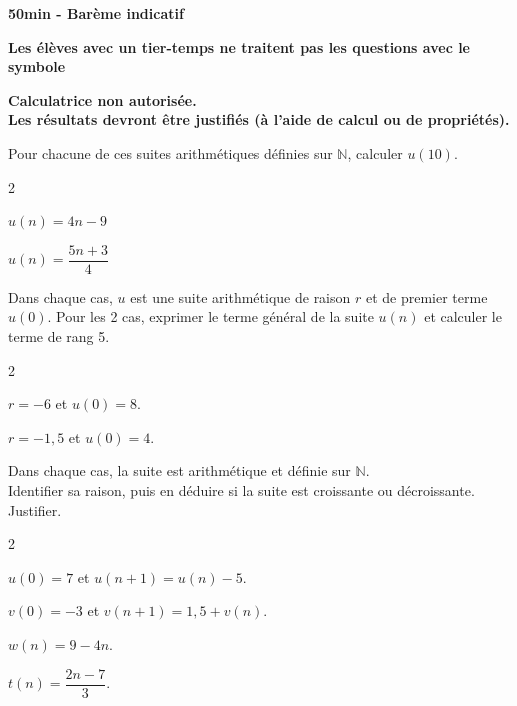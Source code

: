 \documentclass[11pt,a4paper]{article}  %
\begin{document}
	\graphicspath{{images/}}

	\begin{center}
	\end{center}

\begin{center}\textbf{50min - Barème indicatif}\end{center}
\begin{center}\textbf{Les élèves avec un tier-temps ne traitent pas les questions avec  le symbole }\end{center}
\begin{center}\textbf{Calculatrice non autorisée.\\Les résultats devront être justifiés (à l'aide de calcul ou de propriétés).}\end{center}


Pour chacune de ces suites arithmétiques définies sur $\mathbb{N}$, calculer $u(10)$.
\begin{multicols}{2}
	\begin{enumMet}
		\item {} $u(n)=4 n-9$
		\item $u(n)=\dfrac{5 n+3}{4}$
	\end{enumMet}
\end{multicols}

Dans chaque cas, $u$ est une suite arithmétique de raison $r$ et de premier terme $u(0)$. Pour les 2 cas, exprimer le terme général de la suite $u(n)$ et calculer le terme de rang 5.
\begin{multicols}{2}
	\begin{enumMet}
		\item $r=-6$ et $u(0)=8$.
		\item {} $r=-1,5$ et $u(0)=4$.
	\end{enumMet}
\end{multicols}


Dans chaque cas, la suite est arithmétique et définie sur $\mathbb{N}$.\\
Identifier sa raison, puis en déduire si la suite est croissante ou décroissante. Justifier.
\begin{multicols}{2}
	\begin{enumMet}
		\item $u(0)=7$ et $u(n+1)=u(n)-5$.
		\item $v(0)=-3$ et $v(n+1)=1,5+v(n)$.
		\item $w(n)=9-4n$.
		\item {} $t(n)=\dfrac{2n-7}{3}$.
	\end{enumMet}
\end{multicols}
\end{document}
